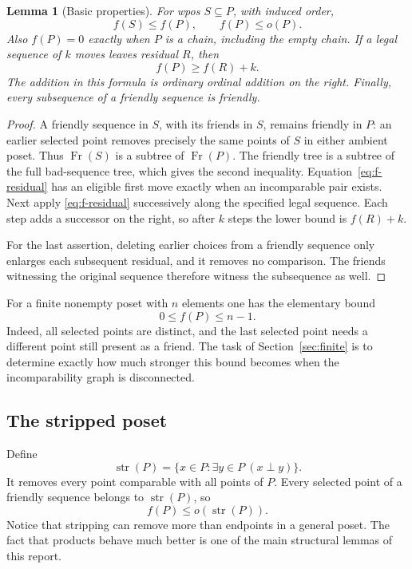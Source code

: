 \documentclass[11pt,letterpaper]{article}
\newtheorem{lemma}[theorem]{Lemma}
\theoremstyle{definition}
\theoremstyle{remark}
\newcommand{\str}{\operatorname{str}}
\newcommand{\Fr}{\operatorname{Fr}}
\begin{document}
\begin{lemma}[Basic properties]\label{lem:basic}
For wpos $S\subseteq P$, with induced order,
\[
 f(S)\le f(P),\qquad f(P)\le o(P).
\]
Also $f(P)=0$ exactly when $P$ is a chain, including the empty chain.
If a legal sequence of $k$ moves leaves residual $R$, then
\begin{equation}\label{eq:moves}
 f(P)\ge f(R)+k.
\end{equation}
The addition in this formula is ordinary ordinal addition on the right.
Finally, every subsequence of a friendly sequence is friendly.
\end{lemma}
\begin{proof}
A friendly sequence in $S$, with its friends in $S$, remains friendly in
$P$: an earlier selected point removes precisely the same points of $S$
in either ambient poset. Thus $\Fr(S)$ is a subtree of $\Fr(P)$.
The friendly tree is a subtree of the full bad-sequence tree, which gives
the second inequality. Equation~\eqref{eq:f-residual} has an eligible first
move exactly when an incomparable pair exists. Next apply
\eqref{eq:f-residual} successively along the specified legal sequence.
Each step adds a successor on the right, so after $k$ steps the lower
bound is $f(R)+k$.

For the last assertion, deleting earlier choices from a friendly sequence
only enlarges each subsequent residual, and it removes no comparison. The
friends witnessing the original sequence therefore witness the subsequence
as well.
\end{proof}

For a finite nonempty poset with $n$ elements one has the elementary bound
\begin{equation}\label{eq:rough-bound}
 0\le f(P)\le n-1.
\end{equation}
Indeed, all selected points are distinct, and the last selected point needs
a different point still present as a friend. The task of
Section~\ref{sec:finite} is to determine exactly how much stronger this bound
becomes when the incomparability graph is disconnected.

\subsection{The stripped poset}
Define
\[
 \str(P)=\{x\in P:\exists y\in P\ (x\perp y)\}.
\]
It removes every point comparable with all points of $P$. Every selected
point of a friendly sequence belongs to $\str(P)$, so
\begin{equation}\label{eq:strip-upper}
 f(P)\le o(\str(P)).
\end{equation}
Notice that stripping can remove more than endpoints in a general poset.
The fact that products behave much better is one of the main structural
lemmas of this report.
\end{document}
